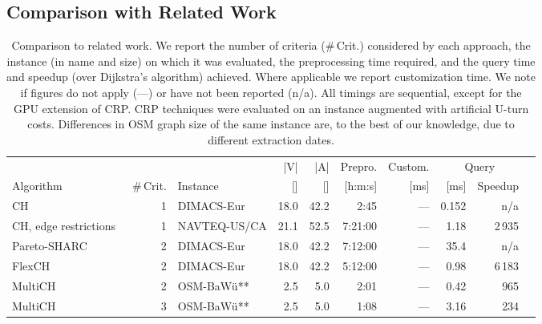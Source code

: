 \documentclass{sig-alternate}
\begin{document}
\subsection{Comparison with Related Work}
\begin{table*}
\caption{\label{tab:related} Comparison to related work. We report the number of criteria (\#\,Crit.) considered by each approach, the instance (in name and size) on which it was evaluated, the preprocessing time required, and the query time and speedup (over Dijkstra's algorithm) achieved. Where applicable we report customization time. We note if figures do not apply (---) or have not been reported (n/a). All timings are sequential, except for the GPU extension of CRP. CRP techniques were evaluated on an instance augmented with artificial U-turn costs. Differences in OSM graph size of the same instance are, to the best of our knowledge, due to different extraction dates.
}
\begin{centering}
\begin{tabular}{lrlrrrrrrr}
\toprule
 & & & |V|& |A| &Prepro.& Custom. & \multicolumn{2}{c}{Query}\\
Algorithm & \#\,Crit.  & Instance & []& []& [h:m:s] & [ms] & [ms] & Speedup\\
\midrule
CH~\cite{gssv-erlrn-12} & 1  & DIMACS-Eur &  18.0 & 42.2 & 2:45 & --- & 0.152 & n/a\\
CH, edge restrictions~\cite{DBLP:journals/jea/GeisbergerRST12} & 1  & NAVTEQ-US/CA  & 21.1 & 52.5 & 7:21:00 &--- & 1.18\phantom{0} & 2\,935\phantom{.0}\\
Pareto-SHARC~\cite{dw-pps-09} & 2  & DIMACS-Eur &  18.0 & 42.2 & 7:12:00 & --- & 35.4\phantom{00} & n/a \\
FlexCH~\cite{gks-rpfof-10} & 2  & DIMACS-Eur & 18.0 & 42.2 & 5:12:00 & --- & 0.98\phantom{0} & 6\,183\phantom{.0}\\
MultiCH~\cite{fs-pcchm-13} & 2  & OSM-BaWü** & 2.5 & 5.0 & 2:01 & ---  & 0.42\phantom{0} & 965\phantom{.0}\\
MultiCH~\cite{fs-pcchm-13} & 3  & OSM-BaWü** & 2.5 & 5.0 & 1:08 & --- & 3.16\phantom{0} & 234\phantom{.0}\\


\end{tabular}
\end{centering}
\end{table*}
\end{document}
